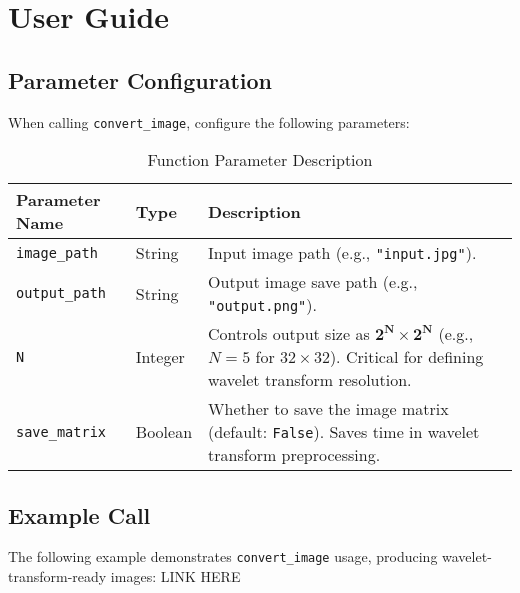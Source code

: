 \documentclass[12pt,a4paper]{article}
\begin{document}
\section{User Guide}
\subsection{Parameter Configuration}
When calling \texttt{convert\_image}, configure the following parameters:  

\begin{table}[h]
\centering
\begin{tabular}{|>{\arraybackslash}p{2.5cm}|>{\arraybackslash}p{2cm}|>{\arraybackslash}p{7.5cm}|}
\hline
\textbf{Parameter Name} & \textbf{Type} & \textbf{Description} \\
\hline
\texttt{image\_path} & String & Input image path (e.g., \texttt{"input.jpg"}). \\
\hline
\texttt{output\_path} & String & Output image save path (e.g., \texttt{"output.png"}). \\
\hline
\texttt{N} & Integer & Controls output size as \(\mathbf{2^N \times 2^N}\) (e.g., \(N = 5\) for \(32 \times 32\)). Critical for defining wavelet transform resolution. \\
\hline
\texttt{save\_matrix} & Boolean & Whether to save the image matrix (default: \texttt{False}). Saves time in wavelet transform preprocessing. \\
\hline
\end{tabular}
\caption{Function Parameter Description}
\end{table}

\subsection{Example Call}
The following example demonstrates \texttt{convert\_image} usage, producing wavelet-transform-ready images:  
LINK HERE


\end{document}
